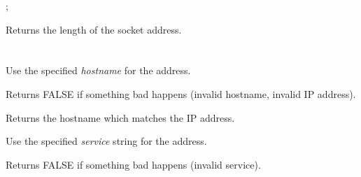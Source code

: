 %
%

;

Returns the length of the socket address.

\section{}\label{wxipv4address}





%
%



Use the specified {\it hostname} for the address.


Returns FALSE if something bad happens (invalid hostname, invalid IP address). 

%
%



Returns the hostname which matches the IP address.

%
%



Use the specified {\it service} string for the address.


Returns FALSE if something bad happens (invalid service).

%
%



